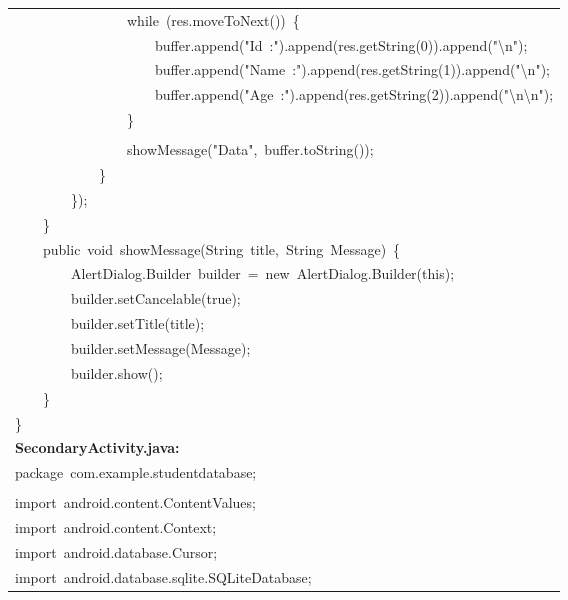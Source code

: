 \documentclass[a4paper,12pt]{article}
\begin{document}
\begin{longtable}{|p{}|}
{\ttfamily\small \ \ \ \ \ \ \ \ \ \ \ \ \ \ \ \ while\ (res.moveToNext())\ \{} \\
{\ttfamily\small \ \ \ \ \ \ \ \ \ \ \ \ \ \ \ \ \ \ \ \ buffer.append("Id\ :").append(res.getString(0)).append("\textbackslash{}n");} \\
{\ttfamily\small \ \ \ \ \ \ \ \ \ \ \ \ \ \ \ \ \ \ \ \ buffer.append("Name\ :").append(res.getString(1)).append("\textbackslash{}n");} \\
{\ttfamily\small \ \ \ \ \ \ \ \ \ \ \ \ \ \ \ \ \ \ \ \ buffer.append("Age\ :").append(res.getString(2)).append("\textbackslash{}n\textbackslash{}n");} \\
{\ttfamily\small \ \ \ \ \ \ \ \ \ \ \ \ \ \ \ \ \}} \\
\strut \\
{\ttfamily\small \ \ \ \ \ \ \ \ \ \ \ \ \ \ \ \ showMessage("Data",\ buffer.toString());} \\
{\ttfamily\small \ \ \ \ \ \ \ \ \ \ \ \ \}} \\
{\ttfamily\small \ \ \ \ \ \ \ \ \});} \\
{\ttfamily\small \ \ \ \ \}} \\
{\ttfamily\small \ \ \ \ public\ void\ showMessage(String\ title,\ String\ Message)\ \{} \\
{\ttfamily\small \ \ \ \ \ \ \ \ AlertDialog.Builder\ builder\ =\ new\ AlertDialog.Builder(this);} \\
{\ttfamily\small \ \ \ \ \ \ \ \ builder.setCancelable(true);} \\
{\ttfamily\small \ \ \ \ \ \ \ \ builder.setTitle(title);} \\
{\ttfamily\small \ \ \ \ \ \ \ \ builder.setMessage(Message);} \\
{\ttfamily\small \ \ \ \ \ \ \ \ builder.show();} \\
{\ttfamily\small \ \ \ \ \}} \\
{\ttfamily\small \}} \\
\hline
\rule{0pt}{13pt}\textbf{SecondaryActivity.java:} \\
\hline
{\ttfamily\small package\ com.example.studentdatabase;} \\
\strut \\
{\ttfamily\small import\ android.content.ContentValues;} \\
{\ttfamily\small import\ android.content.Context;} \\
{\ttfamily\small import\ android.database.Cursor;} \\
{\ttfamily\small import\ android.database.sqlite.SQLiteDatabase;} \\

\end{longtable}
\end{document}
